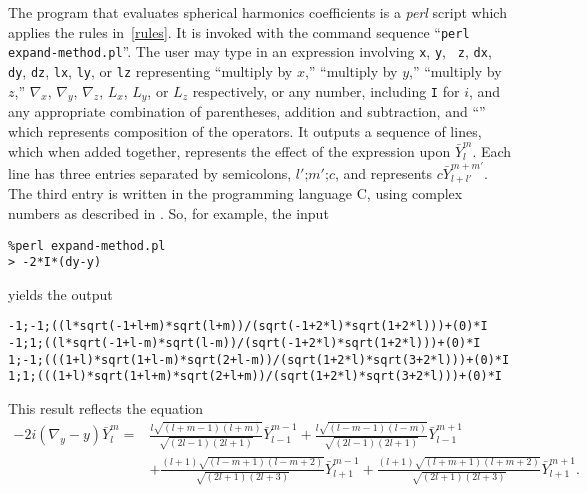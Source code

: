 \documentclass{amsart}
\begin{document}
The program that evaluates spherical harmonics coefficients is a
\emph{perl} script which applies the rules in~\eqref{rules}. It is
invoked with the command sequence ``{\tt perl expand-method.pl}''.
The user may type in an expression involving {\tt x}, {\tt y}, {\tt
z}, {\tt dx}, {\tt dy}, {\tt dz}, {\tt lx}, {\tt ly}, or {\tt lz}
representing ``multiply by $x$,'' ``multiply by $y$,'' ``multiply by
$z$,'' $\nabla_x$, $\nabla_y$, $\nabla_z$, $L_x$, $L_y$, or $L_z$
respectively, or any number, including {\tt I} for $i$, and any
appropriate combination of parentheses, addition and subtraction,
and ``{\tt *}'' which represents composition of the operators.  It
outputs a sequence of lines, which when added together, represents
the effect of the expression upon $\bar Y_l^m$.  Each line has three
entries separated by semicolons, $l'$;$m'$;$c$, and represents
$c\bar Y_{l+l'}^{m+m'}$.  The third entry is written in the
programming language C, using complex numbers as described in
\cite{c:99}.  So, for example, the input
\begin{verbatim}
%perl expand-method.pl
> -2*I*(dy-y)
\end{verbatim}
yields the output
\begin{verbatim}
-1;-1;((l*sqrt(-1+l+m)*sqrt(l+m))/(sqrt(-1+2*l)*sqrt(1+2*l)))+(0)*I
-1;1;((l*sqrt(-1+l-m)*sqrt(l-m))/(sqrt(-1+2*l)*sqrt(1+2*l)))+(0)*I
1;-1;(((1+l)*sqrt(1+l-m)*sqrt(2+l-m))/(sqrt(1+2*l)*sqrt(3+2*l)))+(0)*I
1;1;(((1+l)*sqrt(1+l+m)*sqrt(2+l+m))/(sqrt(1+2*l)*sqrt(3+2*l)))+(0)*I
\end{verbatim}
This result reflects the equation
\begin{equation*}
\begin{split}
-2i(\nabla_y - y)\bar Y_l^m = &
\tfrac{l\sqrt{(l+m-1)(l+m)}}{\sqrt{(2l-1)(2l+1)}} \bar Y_{l-1}^{m-1}
+ \tfrac{l\sqrt{(l-m-1)(l-m)}}{\sqrt{(2l-1)(2l+1)}} \bar Y_{l-1}^{m+1} \\
& + \tfrac{(l+1)\sqrt{(l-m+1)(l-m+2)}}{\sqrt{(2l+1)(2l+3)}} \bar Y_{l+1}^{m-1}
+ \tfrac{(l+1)\sqrt{(l+m+1)(l+m+2)}}{\sqrt{(2l+1)(2l+3)}} \bar Y_{l+1}^{m+1} .
\end{split}
\end{equation*}
\end{document}
